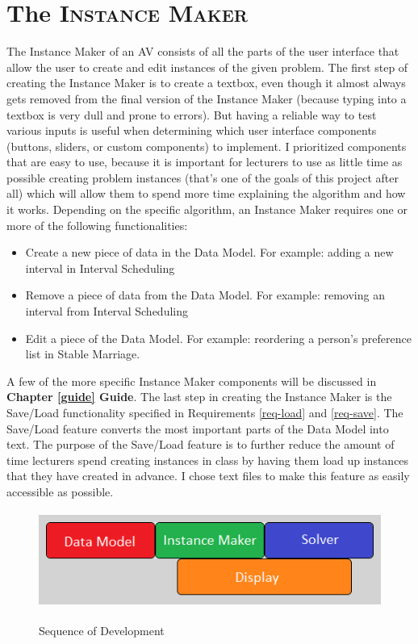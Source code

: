 \section{The \textsc{Instance Maker}}
\hspace{-0.26in}
The Instance Maker of an AV consists of all the parts of the user interface 
that allow the user to create and edit instances of the given problem. 
The first step of creating the Instance Maker is to create a textbox, 
even though it almost always gets removed from the final version of the Instance Maker 
(because typing into a textbox is very dull and prone to errors). 
But having a reliable way to test various inputs is useful when determining
which user interface components (buttons, sliders, or custom components) to implement.
\newline\newline
I prioritized components that are easy to use, 
because it is important for lecturers to use as little time as possible
creating problem instances (that's one of the goals of this project after all)
which will allow them to spend more time explaining the algorithm and how it works. 
\newline\newline
Depending on the specific algorithm, an Instance Maker requires one or more of 
the following functionalities:
\begin{itemize}
	\item Create a new piece of data in the Data Model. 
		\subitem For example: adding a new interval in Interval Scheduling
	\item Remove a piece of data from the Data Model.
		\subitem For example: removing an interval from Interval Scheduling
	\item Edit a piece of the Data Model.
		\subitem For example: reordering a person's preference list in Stable Marriage.
\end{itemize}
A few of the more specific Instance Maker components will be discussed in \textbf{Chapter \ref{guide} Guide}.
\newline\newline
The last step in creating the Instance Maker is the 
Save/Load functionality specified in 
Requirements \ref{req-load} and \ref{req-save}.
The Save/Load feature converts the most important parts of the Data Model into text. 
The purpose of the Save/Load feature is 
to further reduce the amount of time lecturers spend creating instances in class
by having them load up instances that they have created in advance.
I chose text files to make this feature as easily accessible as possible. 
%
\begin{figure}[ht]
	\centering
	\caption{Sequence of Development}	
	\includegraphics[height=1.25in]{images/development-process-timing.png}
	\label{fig-develpoment-process-timing}
\end{figure}
